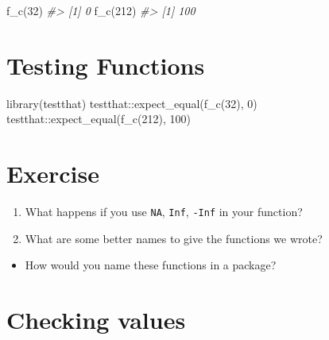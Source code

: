 \documentclass[
]{book}
\newenvironment{Shaded}{\begin{snugshade}}{\end{snugshade}}
\newcommand{\CommentTok}[1]{\textcolor[rgb]{0.56,0.35,0.01}{\textit{#1}}}
\newcommand{\DecValTok}[1]{\textcolor[rgb]{0.00,0.00,0.81}{#1}}
\newcommand{\FunctionTok}[1]{\textcolor[rgb]{0.00,0.00,0.00}{#1}}
\newcommand{\NormalTok}[1]{#1}
\newcommand{\SpecialCharTok}[1]{\textcolor[rgb]{0.00,0.00,0.00}{#1}}
\providecommand{\tightlist}{%
  \setlength{\itemsep}{0pt}\setlength{\parskip}{0pt}}
\begin{document}
\begin{Shaded}
\begin{Highlighting}[]
\FunctionTok{f\_c}\NormalTok{(}\DecValTok{32}\NormalTok{)}
\CommentTok{\#\textgreater{} [1] 0}
\FunctionTok{f\_c}\NormalTok{(}\DecValTok{212}\NormalTok{)}
\CommentTok{\#\textgreater{} [1] 100}
\end{Highlighting}
\end{Shaded}

\hypertarget{testing-functions}{%
\section{Testing Functions}\label{testing-functions}}

\begin{Shaded}
\begin{Highlighting}[]
\FunctionTok{library}\NormalTok{(testthat)}
\NormalTok{testthat}\SpecialCharTok{::}\FunctionTok{expect\_equal}\NormalTok{(}\FunctionTok{f\_c}\NormalTok{(}\DecValTok{32}\NormalTok{), }\DecValTok{0}\NormalTok{)}
\NormalTok{testthat}\SpecialCharTok{::}\FunctionTok{expect\_equal}\NormalTok{(}\FunctionTok{f\_c}\NormalTok{(}\DecValTok{212}\NormalTok{), }\DecValTok{100}\NormalTok{)}
\end{Highlighting}
\end{Shaded}

\hypertarget{exercise}{%
\section{Exercise}\label{exercise}}

\begin{enumerate}
\def\labelenumi{\arabic{enumi}.}
\tightlist
\item
  What happens if you use \texttt{NA}, \texttt{Inf}, \texttt{-Inf} in your function?
\item
  What are some better names to give the functions we wrote?
\end{enumerate}

\begin{itemize}
\tightlist
\item
  How would you name these functions in a package?
\end{itemize}

\hypertarget{checking-values}{%
\section{Checking values}\label{checking-values}}
\end{document}
